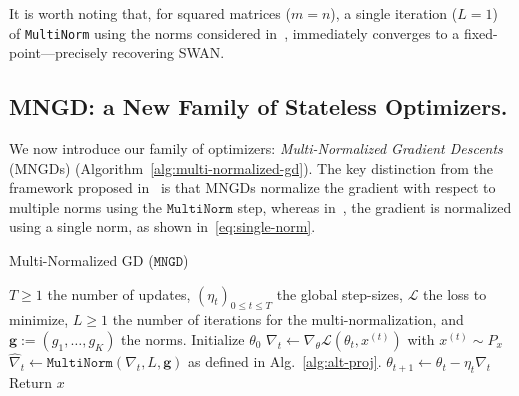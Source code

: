\begin{remark}
It is worth noting that, for squared matrices ($m=n$), a single iteration ($L=1$) of \texttt{MultiNorm} using the norms considered in~\cite{ma2024swansgdnormalizationwhitening}, immediately converges to a fixed-point---precisely recovering SWAN.
\end{remark}



\subsection{MNGD: a New Family of Stateless Optimizers.} 


We now introduce our family of optimizers: \emph{Multi-Normalized Gradient Descents} (MNGDs) (Algorithm~\ref{alg:multi-normalized-gd}). The key distinction from the framework proposed in~\cite{bernstein2024old} is that MNGDs normalize the gradient with respect to multiple norms using the 
$\texttt{MultiNorm}$ step, whereas in~\cite{bernstein2024old}, the gradient is normalized using a single norm, as shown in~\eqref{eq:single-norm}.
\begin{algorithm}[!t]
   \caption{Multi-Normalized GD ($\texttt{MNGD}$)}
   \label{alg:multi-normalized-gd}
\begin{algorithmic}
    $T\geq 1$ the number of updates, $(\eta_t)_{0\leq t\leq T}$ the global step-sizes, $\mathcal{L}$ the loss to minimize, $L\geq 1$ the number of iterations for the multi-normalization, and $\bm{g}:=(g_1,\dots,g_K)$ the norms.
   \STATE Initialize $\theta_0$
    \STATE $\nabla_t\gets \nabla_{\theta}\mathcal{L}(\theta_t, x^{(t)})$ with $x^{(t)}\sim P_x$
    \STATE $\hat{\nabla}_t \gets \texttt{MultiNorm}(\nabla_t,L, \bm{g})$ as defined in Alg.~\ref{alg:alt-proj}.
    \STATE $\theta_{t+1} \gets \theta_t - \eta_t \hat{\nabla}_t$
    \ENDFOR
    \STATE Return $x$
\end{algorithmic}
\end{algorithm}

